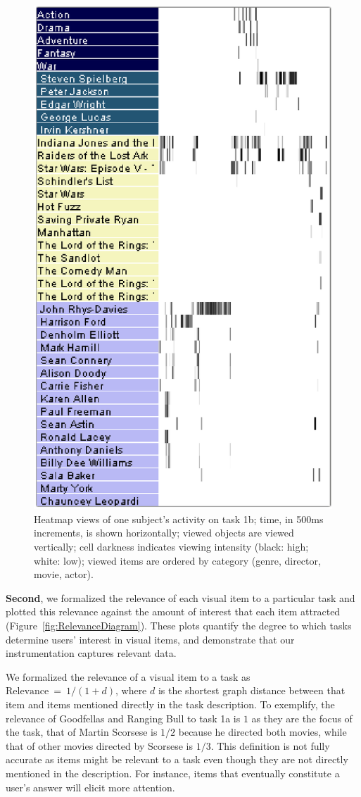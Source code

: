 \begin{figure}[!ht]
  \centering
  \includegraphics[width=0.75\linewidth]{images/heatmaps.eps}
  \caption{Heatmap views of one subject's activity on task 1b; time, in 500ms increments, is shown horizontally; viewed objects are viewed vertically; cell darkness indicates viewing intensity (black: high; white: low); viewed items are ordered by category (genre, director, movie, actor). 
}
	\label{fig:heatmap}
\end{figure}

\vspace{2mm}\noindent
\textbf{Second}, we formalized the relevance of each visual item to a particular task and plotted this relevance against the amount of interest that each item attracted (Figure~\ref{fig:RelevanceDiagram}). These plots quantify the degree to which tasks determine users' interest in visual items, and demonstrate that our instrumentation captures relevant data.    

We formalized the relevance of a visual item to a task as $\text{Relevance}~=~1/(1+d)$, where $d$  is the shortest graph distance between that item and items mentioned directly in the task description.  To exemplify, the relevance of Goodfellas and Ranging Bull to task 1a is $1$ as they are the focus of the task, that of Martin Scorsese is $1/2$  because he directed both movies, while that of other movies directed by Scorsese is $1/3$. This definition is not fully accurate as items might be relevant to a task even though they are not directly mentioned in the description.  For instance, items that eventually constitute a user's answer will elicit more attention. 

